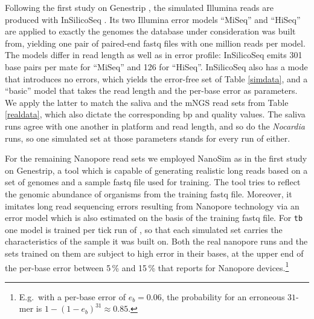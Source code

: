 \documentclass[pdflatex,sn-vancouver-num]{sn-jnl}
\begin{document}
    Following the first study on Genestrip \citep{genestrip-pub}, the simulated Illumina reads are produced with InSilicoSeq \citep{10.1093/bioinformatics/bty630}. Its two Illumina error models \enquote{MiSeq} and \enquote{HiSeq} are applied to exactly the genomes the database under consideration was built from, yielding one pair of paired-end fastq files with one million reads per model. The models differ in read length as well as in error profile: InSilicoSeq emits 301 base pairs per mate for \enquote{MiSeq} and 126 for \enquote{HiSeq}. InSilicoSeq also has a mode that introduces no errors, which yields the error-free set of Table \ref{simdata}, and a \enquote{basic} model that takes the read length and the per-base error as parameters. We apply the latter to match the saliva and the mNGS read sets from Table \ref{realdata}, which also dictate the corresponding bp and quality values. The saliva runs agree with one another in platform and read length, and so do the \emph{Nocardia} runs, so one simulated set at those parameters stands for every run of either.

    For the remaining Nanopore read sets we employed NanoSim \citep{10.1093/gigascience/gix010,10.1093/gigascience/giad013} as in the first study on Genestrip, a tool which is capable of generating realistic long reads based on a set of genomes and a sample fastq file used for training. The tool tries to reflect the genomic abundance of organisms from the training fastq file. Moreover, it imitates long read sequencing errors resulting from Nanopore technology via an error model which is also estimated on the basis of the training fastq file. For \texttt{tb} one model is trained per tick run of \citep{nanoporeticks}, so that each simulated set carries the characteristics of the sample it was built on. Both the real nanopore runs and the sets trained on them are subject to high error in their bases, at the upper end of the per-base error between 5\,\% and 15\,\% that \citep{nanoporeerror} reports for Nanopore devices.\footnote{E.g.\ with a per-base error of $e_b = 0.06$, the probability for an erroneous $31$-mer is $1-(1-e_b)^{31} \approx 0.85$.}
\end{document}
